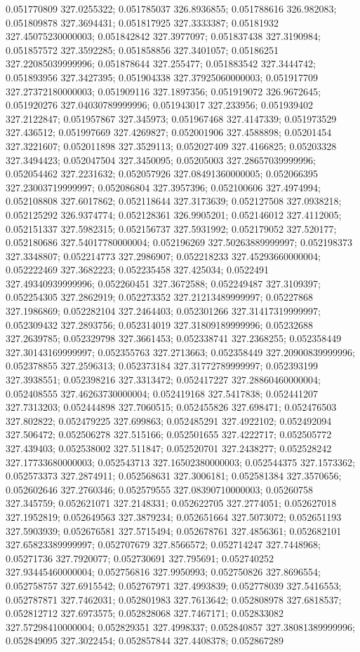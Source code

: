 0.051770809 327.0255322; 0.051785037 326.8936855; 0.051788616 326.982083; 0.051809878 327.3694431; 0.051817925 327.3333387; 0.05181932 327.45075230000003; 0.051842842 327.3977097; 0.051837438 327.3190984; 0.051857572 327.3592285; 0.051858856 327.3401057; 0.05186251 327.22085039999996; 0.051878644 327.255477; 0.051883542 327.3444742; 0.051893956 327.3427395; 0.051904338 327.37925060000003; 0.051917709 327.27372180000003; 0.051909116 327.1897356; 0.051919072 326.9672645; 0.051920276 327.04030789999996; 0.051943017 327.233956; 0.051939402 327.2122847; 0.051957867 327.345973; 0.051967468 327.4147339; 0.051973529 327.436512; 0.051997669 327.4269827; 0.052001906 327.4588898; 0.05201454 327.3221607; 0.052011898 327.3529113; 0.052027409 327.4166825; 0.05203328 327.3494423; 0.052047504 327.3450095; 0.05205003 327.28657039999996; 0.052054462 327.2231632; 0.052057926 327.08491360000005; 0.052066395 327.23003719999997; 0.052086804 327.3957396; 0.052100606 327.4974994; 0.052108808 327.6017862; 0.052118644 327.3173639; 0.052127508 327.0938218; 0.052125292 326.9374774; 0.052128361 326.9905201; 0.052146012 327.4112005; 0.052151337 327.5982315; 0.052156737 327.5931992; 0.052179052 327.520177; 0.052180686 327.54017780000004; 0.052196269 327.50263889999997; 0.052198373 327.3348807; 0.052214773 327.2986907; 0.052218233 327.45293660000004; 0.052222469 327.3682223; 0.052235458 327.425034; 0.0522491 327.49340939999996; 0.052260451 327.3672588; 0.052249487 327.3109397; 0.052254305 327.2862919; 0.052273352 327.21213489999997; 0.05227868 327.1986869; 0.052282104 327.2464403; 0.052301266 327.31417319999997; 0.052309432 327.2893756; 0.052314019 327.31809189999996; 0.05232688 327.2639785; 0.052329798 327.3661453; 0.052338741 327.2368255; 0.052358449 327.30143169999997; 0.052355763 327.2713663; 0.052358449 327.20900839999996; 0.052378855 327.2596313; 0.052373184 327.31772789999997; 0.052393199 327.3938551; 0.052398216 327.3313472; 0.052417227 327.28860460000004; 0.052408555 327.46263730000004; 0.052419168 327.5417838; 0.052441207 327.7313203; 0.052444898 327.7060515; 0.052455826 327.698471; 0.052476503 327.802822; 0.052479225 327.699863; 0.052485291 327.4922102; 0.052492094 327.506472; 0.052506278 327.515166; 0.052501655 327.4222717; 0.052505772 327.439403; 0.052538002 327.511847; 0.052520701 327.2438277; 0.052528242 327.17733680000003; 0.052543713 327.16502380000003; 0.052544375 327.1573362; 0.052573373 327.2874911; 0.052568631 327.3006181; 0.052581384 327.3570656; 0.052602646 327.2760346; 0.052579555 327.08390710000003; 0.05260758 327.345759; 0.052621071 327.2148331; 0.052622705 327.2774051; 0.052627018 327.1952819; 0.052649563 327.3879234; 0.052651664 327.5073072; 0.052651193 327.5903939; 0.052676581 327.5715494; 0.052678761 327.4856361; 0.052682101 327.65823389999997; 0.052707679 327.8566572; 0.052714247 327.7448968; 0.05271736 327.7920077; 0.052730691 327.795691; 0.052740252 327.93445460000004; 0.052756816 327.9950993; 0.052750826 327.8696554; 0.052758757 327.6915542; 0.052767971 327.4993839; 0.052778039 327.5416553; 0.052787871 327.7462031; 0.052801983 327.7613642; 0.052808978 327.6818537; 0.052812712 327.6973575; 0.052828068 327.7467171; 0.052833082 327.57298410000004; 0.052829351 327.4998337; 0.052840857 327.38081389999996; 0.052849095 327.3022454; 0.052857844 327.4408378; 0.052867289 